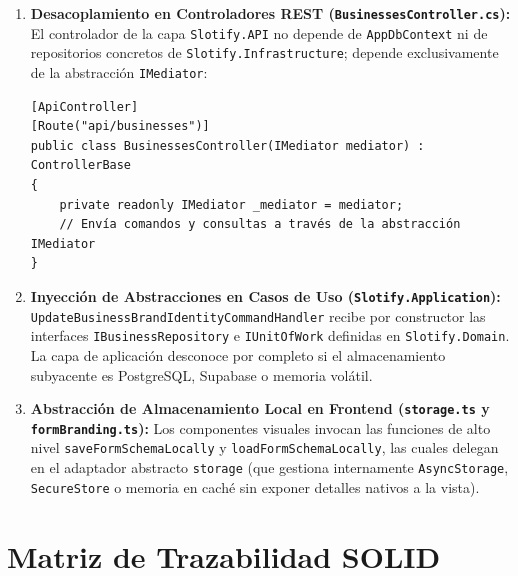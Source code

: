 \documentclass[11pt,a4paper]{article}
\begin{document}
\begin{enumerate}[label=\textbf{\arabic*.}]
    \item \textbf{Desacoplamiento en Controladores REST (\texttt{BusinessesController.cs}):} El controlador de la capa \texttt{Slotify.API} no depende de \texttt{AppDbContext} ni de repositorios concretos de \texttt{Slotify.Infrastructure}; depende exclusivamente de la abstracción \texttt{IMediator}:
\begin{lstlisting}[language={[Sharp]C}]
[ApiController]
[Route("api/businesses")]
public class BusinessesController(IMediator mediator) : ControllerBase
{
    private readonly IMediator _mediator = mediator;
    // Envía comandos y consultas a través de la abstracción IMediator
}
\end{lstlisting}
    \item \textbf{Inyección de Abstracciones en Casos de Uso (\texttt{Slotify.Application}):} \texttt{UpdateBusinessBrandIdentityCommandHandler} recibe por constructor las interfaces \texttt{IBusinessRepository} e \texttt{IUnitOfWork} definidas en \texttt{Slotify.Domain}. La capa de aplicación desconoce por completo si el almacenamiento subyacente es PostgreSQL, Supabase o memoria volátil.
    \item \textbf{Abstracción de Almacenamiento Local en Frontend (\texttt{storage.ts} y \texttt{formBranding.ts}):} Los componentes visuales invocan las funciones de alto nivel \texttt{saveFormSchemaLocally} y \texttt{loadFormSchemaLocally}, las cuales delegan en el adaptador abstracto \texttt{storage} (que gestiona internamente \texttt{AsyncStorage}, \texttt{SecureStore} o memoria en caché sin exponer detalles nativos a la vista).
\end{enumerate}

\section{Matriz de Trazabilidad SOLID}
\end{document}
